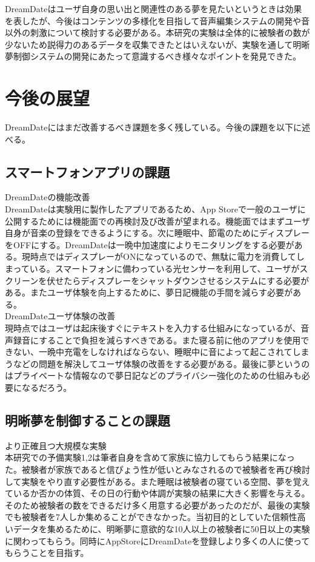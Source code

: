 DreamDateはユーザ自身の思い出と関連性のある夢を見たいというときは効果を表したが、今後はコンテンツの多様化を目指して音声編集システムの開発や音以外の刺激について検討する必要がある。本研究の実験は全体的に被験者の数が少ないため説得力のあるデータを収集できたとはいえないが、実験を通して明晰夢制御システムの開発にあたって意識するべき様々なポイントを発見できた。

\section{今後の展望}
DreamDateにはまだ改善するべき課題を多く残している。今後の課題を以下に述べる。

\subsection{スマートフォンアプリの課題}
DreamDateの機能改善\\
DreamDateは実験用に製作したアプリであるため、App Storeで一般のユーザに公開するためには機能面での再検討及び改善が望まれる。機能面ではまずユーザ自身が音楽の登録をできるようにする。次に睡眠中、節電のためにディスプレーをOFFにする。DreamDateは一晩中加速度によりモニタリングをする必要がある。現時点ではディスプレーがONになっているので、無駄に電力を消費してしまっている。スマートフォンに備わっている光センサーを利用して、ユーザがスクリーンを伏せたらディスプレーをシャットダウンさせるシステムにする必要がある。またユーザ体験を向上するために、夢日記機能の手間を減らす必要がある。\\

DreamDateユーザ体験の改善\\
現時点ではユーザは起床後すぐにテキストを入力する仕組みになっているが、音声録音にすることで負担を減らすべきである。また寝る前に他のアプリを使用できない、一晩中充電をしなければならない、睡眠中に音によって起こされてしまうなどの問題を解決してユーザ体験の改善をする必要がある。最後に夢というのはプライベートな情報なので夢日記などのプライバシー強化のための仕組みも必要になるだろう。\\

\subsection{明晰夢を制御することの課題}
より正確且つ大規模な実験\\
本研究での予備実験1,2は筆者自身を含めて家族に協力してもらう結果になった。被験者が家族であると信ぴょう性が低いとみなされるので被験者を再び検討して実験をやり直す必要性がある。また睡眠は被験者の寝ている空間、夢を覚えているか否かの体質、その日の行動や体調が実験の結果に大きく影響を与える。そのため被験者の数をできるだけ多く用意する必要があったのだが、最後の実験でも被験者を7人しか集めることができなかった。当初目的としていた信頼性高いデータを集めるために、明晰夢に意欲的な10人以上の被験者に50日以上の実験に関わってもらう。同時にAppStoreにDreamDateを登録しより多くの人に使ってもらうことを目指す。\\

